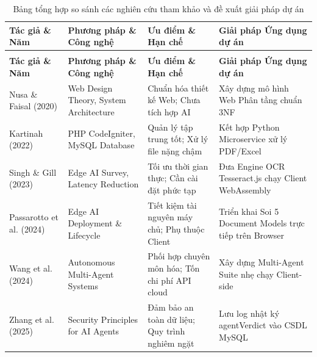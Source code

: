 \documentclass[12pt,a4paper]{report}
\begin{document}
{\fontsize{10pt}{12pt}\selectfont
  \begin{xltabular}{\linewidth}{|>{\raggedright\arraybackslash}p{3.2cm}|>{\raggedright\arraybackslash}X|>{\raggedright\arraybackslash}X|>{\raggedright\arraybackslash}X|}
    \caption{Bảng tổng hợp so sánh các nghiên cứu tham khảo và đề xuất giải pháp dự án} \label{tab:so_sanh_tai_lieu} \\
    \hline
    \textbf{Tác giả \& Năm} & \textbf{Phương pháp \& Công nghệ} & \textbf{Ưu điểm \& Hạn chế} & \textbf{Giải pháp Ứng dụng dự án} \\ \hline
    \endfirsthead
     \\ \hline
    \textbf{Tác giả \& Năm} & \textbf{Phương pháp \& Công nghệ} & \textbf{Ưu điểm \& Hạn chế} & \textbf{Giải pháp Ứng dụng dự án} \\ \hline
    \endhead
    \hline
    \endfoot
    Nusa \& Faisal (2020) \cite{nusa2020iop}           & Web Design Theory, System Architecture & Chuẩn hóa thiết kế Web; Chưa tích hợp AI       & Xây dựng mô hình Web Phân tầng chuẩn 3NF                \\ \hline
    Kartinah (2022) \cite{kartinah2022eajmr}           & PHP CodeIgniter, MySQL Database        & Quản lý tập trung tốt; Xử lý file nặng chậm    & Kết hợp Python Microservice xử lý PDF/Excel             \\ \hline
    Singh \& Gill (2023) \cite{singh2023edgeai}        & Edge AI Survey, Latency Reduction      & Tối ưu thời gian thực; Cần cài đặt phức tạp    & Đưa Engine OCR Tesseract.js chạy Client WebAssembly     \\ \hline
    Passarotto et al. (2024) \cite{passarotto2024edge} & Edge AI Deployment \& Lifecycle        & Tiết kiệm tài nguyên máy chủ; Phụ thuộc Client & Triển khai Soi 5 Document Models trực tiếp trên Browser \\ \hline
    Wang et al. (2024) \cite{wang2024survey}           & Autonomous Multi-Agent Systems         & Phối hợp chuyên môn hóa; Tốn chi phí API cloud & Xây dựng Multi-Agent Suite nhẹ chạy Client-side         \\ \hline
    Zhang et al. (2025) \cite{zhang2025llm}            & Security Principles for AI Agents      & Đảm bảo an toàn dữ liệu; Quy trình nghiêm ngặt & Lưu log nhật ký agentVerdict vào CSDL MySQL             \\ \hline
  \end{xltabular}}
\end{document}

